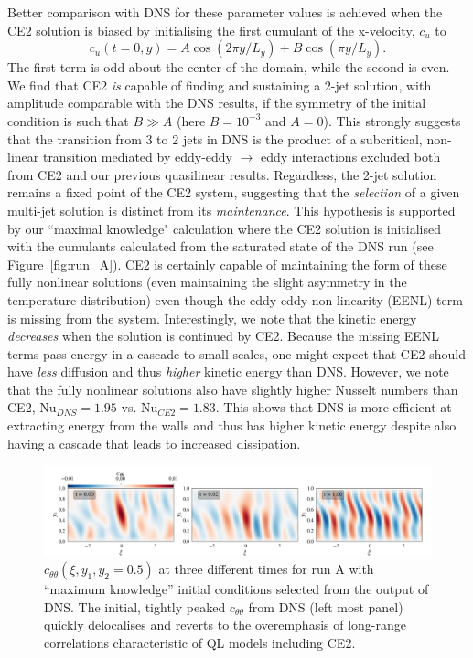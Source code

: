 \documentclass{jfm}
\newcommand{\cu}{c_u}
\newcommand{\ctt}{c_{\theta \theta}}
\begin{document}
Better comparison with DNS for these parameter values is achieved when the CE2 solution is biased 
 by initialising the first cumulant of the x-velocity, $\cu$ to
\begin{equation}
  \label{eq:bias}
  \cu(t=0, y) = A \cos(2\pi y/L_y) + B \cos (\pi y/L_y).
\end{equation}
The first term is odd about the center of the domain, while the second is even.
We find that CE2 \emph{is} capable of finding and sustaining a 2-jet solution, with amplitude comparable with the DNS results, if the symmetry of the initial condition is such that $B \gg A$ (here $B = 10^{-3}$ and $A = 0$).
This strongly suggests that the transition from 3 to 2 jets in DNS is the product of a subcritical, non-linear transition mediated by eddy-eddy $\to$ eddy interactions excluded both from CE2 and our previous quasilinear results.
Regardless, the 2-jet solution remains a fixed point of the CE2 system, suggesting that the \emph{selection} of a given multi-jet solution is distinct from its \emph{maintenance}.
This hypothesis is supported by our ``maximal knowledge" calculation where the CE2 solution is initialised with the cumulants calculated from the saturated state of the DNS run (see Figure~\ref{fig:run_A}). CE2 is certainly capable of maintaining the form of these fully nonlinear solutions (even maintaining the slight asymmetry in the temperature distribution) even though the eddy-eddy non-linearity (EENL) term is missing from the system.
Interestingly, we note that the kinetic energy \emph{decreases} when the solution is continued by CE2. Because the missing EENL terms pass energy in a cascade to small scales, one might expect that CE2 should have \emph{less} diffusion and thus \emph{higher} kinetic energy than DNS.
However, we note that the fully nonlinear solutions also have slightly higher Nusselt numbers than CE2, $\mathrm{Nu}_{DNS} = 1.95$ vs. $\mathrm{Nu}_{CE2} = 1.83$. This shows that DNS is more efficient at extracting energy from the walls and thus has higher kinetic energy despite also having a cascade that leads to increased dissipation.
\begin{figure}
    \centering
    \includegraphics[width=\textwidth]{run_A_decoherence.pdf}
    \caption{$\ctt(\xi, y_1, y_2 = 0.5)$ at three different times for run A with ``maximum knowledge'' initial conditions selected from the output of DNS. The initial, tightly peaked $\ctt$ from DNS (left most panel) quickly delocalises and reverts to the overemphasis of long-range correlations characteristic of QL models including CE2.}
    \label{fig:run_A_decoherence}
\end{figure}
\end{document}
